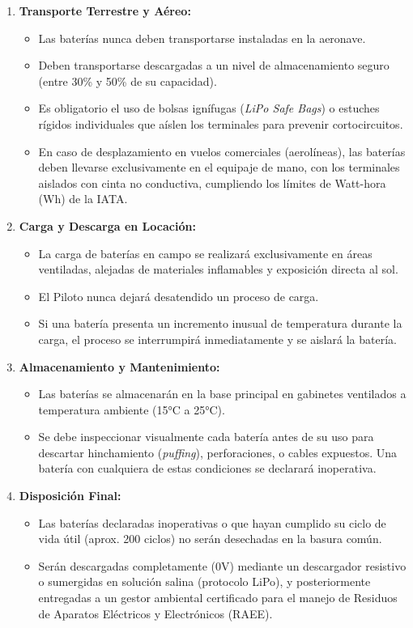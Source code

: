 \begin{enumerate}
    \item \textbf{Transporte Terrestre y Aéreo:}
    \begin{itemize}
        \item Las baterías nunca deben transportarse instaladas en la aeronave.
        \item Deben transportarse descargadas a un nivel de almacenamiento seguro (entre 30\% y 50\% de su capacidad).
        \item Es obligatorio el uso de bolsas ignífugas (\textit{LiPo Safe Bags}) o estuches rígidos individuales que aíslen los terminales para prevenir cortocircuitos.
        \item En caso de desplazamiento en vuelos comerciales (aerolíneas), las baterías deben llevarse exclusivamente en el equipaje de mano, con los terminales aislados con cinta no conductiva, cumpliendo los límites de Watt-hora (Wh) de la IATA.
    \end{itemize}

    \item \textbf{Carga y Descarga en Locación:}
    \begin{itemize}
        \item La carga de baterías en campo se realizará exclusivamente en áreas ventiladas, alejadas de materiales inflamables y exposición directa al sol.
        \item El Piloto nunca dejará desatendido un proceso de carga.
        \item Si una batería presenta un incremento inusual de temperatura durante la carga, el proceso se interrumpirá inmediatamente y se aislará la batería.
    \end{itemize}

    \item \textbf{Almacenamiento y Mantenimiento:}
    \begin{itemize}
        \item Las baterías se almacenarán en la base principal en gabinetes ventilados a temperatura ambiente (15°C a 25°C).
        \item Se debe inspeccionar visualmente cada batería antes de su uso para descartar hinchamiento (\textit{puffing}), perforaciones, o cables expuestos. Una batería con cualquiera de estas condiciones se declarará inoperativa.
    \end{itemize}

    \item \textbf{Disposición Final:}
    \begin{itemize}
        \item Las baterías declaradas inoperativas o que hayan cumplido su ciclo de vida útil (aprox. 200 ciclos) no serán desechadas en la basura común.
        \item Serán descargadas completamente (0V) mediante un descargador resistivo o sumergidas en solución salina (protocolo LiPo), y posteriormente entregadas a un gestor ambiental certificado para el manejo de Residuos de Aparatos Eléctricos y Electrónicos (RAEE).
    \end{itemize}
\end{enumerate}
